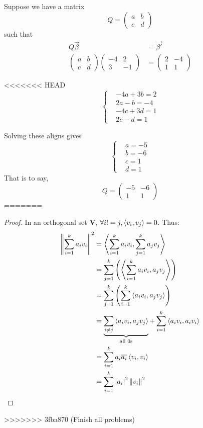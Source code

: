 \begin{homeworkProblem}

\solution

Suppose we have a matrix \[
Q = \begin{pmatrix}
    a & b \\
    c & d
\end{pmatrix}
\] such that
\[
\begin{aligned}
    Q\vec{\beta} &= \vec{\beta'} \\
    \begin{pmatrix}
        a & b \\
        c & d
    \end{pmatrix} \begin{pmatrix}
        -4 &  2 \\
        3  & -1
    \end{pmatrix} &=
    \begin{pmatrix}
        2 & -4 \\
        1 &  1
    \end{pmatrix}
\end{aligned}
\]

<<<<<<< HEAD
\[\left\{
\begin{aligned}
    &-4a + 3b = 2\\
    & 2a - b = -4 \\
    &-4c + 3d = 1\\
    & 2c - d = 1
\end{aligned}\right.
\]

Solving these aligns gives
\[\left\{
\begin{aligned}
        &a = -5\\
        &b = -6\\
        &c =  1\\
        &d =  1
\end{aligned}\right.
\]
That is to say,
\[
Q =
\begin{pmatrix}
    -5 & -6 \\
     1 &  1
\end{pmatrix}\]
=======
\solution

\begin{proof}

In an orthogonal set $\mathbf{V}$, $\forall i != j, \innerprod[v_i]{v_j} = 0$. Thus:
\[
\begin{aligned}
\norm{\sum_{i=1}^{k}a_iv_i}^2 &= \innerprod[\sum_{i=1}^{k}a_iv_i]{\sum_{j=1}^{k}a_jv_j} \\
&= \sum_{j=1}^{k}\left(\innerprod[\sum_{i=1}^{k}a_iv_i]{a_jv_j}\right)\\
&= \sum_{j=1}^{k}\left(\sum_{i=1}^{k}\innerprod[a_iv_i]{a_jv_j}\right)\\
&= \underbrace{\sum_{i \neq j}\innerprod[a_iv_i]{a_jv_j}}_{\text{all 0s}} + \sum_{i=1}^{k} \innerprod[a_iv_i]{a_iv_i} \\
&= \sum_{i=1}^{k} a_i \overline{a_i}\innerprod[v_i]{v_i}\\
&= \sum_{i=1}^k \left|a_i\right|^2 \norm{v_i}^2
\end{aligned}
\]


\end{proof}
>>>>>>> 3fba870 (Finish all problems)

\end{homeworkProblem}
